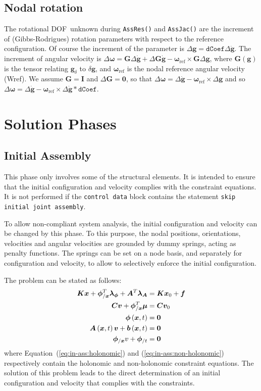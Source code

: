 \documentclass[10pt,dvips,fleqn,subeqn]{report}
\newcommand{\T}[1]{\bm{#1}}
\newcommand{\TT}[1]{\bm{#1}}
\newcommand{\dof}{DOF}
\begin{document}
\section{Nodal rotation}
The rotational \dof\ unknown during \texttt{AssRes()} and \texttt{AssJac()}
are the increment of (Gibbs-Rodrigues) rotation parameters
with respect to the reference configuration.
Of course the increment of the parameter is
$\Delta \T g=\texttt{dCoef}\Delta \dot{\T g}$.
The increment of angular velocity is 
$\Delta \T \omega = \T G\Delta \dot{\T g}+ \Delta \T G \dot{\T g}-
\T \omega_{\mathrm{ref}}\times \T G \Delta \T g$,
where $\T G(\T g)$ is the tensor relating $\T g_\delta$ to $\delta \T g$,
and $\T \omega_{\mathrm{ref}}$ is the nodal reference angular velocity (Wref).
We assume $\T G = \T I$ and $\Delta \T G = \T 0$,
so that $\Delta \T \omega = \Delta \dot{\T g}-\T \omega_{\mathrm{ref}}\times\Delta \T g$
and so $\Delta \T \omega = \Delta \dot{\T g}-
\T \omega_{\mathrm{ref}}\times\Delta \dot{\T g} * \texttt{dCoef}$.


\chapter{Solution Phases}
\section{Initial Assembly}
This phase only involves some of the structural elements.
It is intended to ensure that the initial configuration and velocity 
complies with the constraint equations.
It is not performed if the \texttt{control data} block contains 
the statement \texttt{skip initial joint assembly}.

To allow non-compliant system analysis, the initial configuration 
and velocity can be changed by this phase.
To this purpose, the nodal positions, orientations, velocities
and angular velocities are grounded by dummy springs, acting 
as penalty functions.
The springs can be set on a node basis, and separately 
for configuration and velocity, to allow to selectively enforce 
the initial configuration.

The problem can be stated as follows:
\begin{align}
	\TT{K} \T{x} + \T{\phi}_{/\T{x}}^T \T{\lambda}_{\T{\phi}} + \TT{A}^T \T{\lambda}_{\TT{A}}
		& = \TT{K} \T{x}_0 + \T{f} \\
	\TT{C} \T{v} + \T{\phi}_{/\T{x}}^T \T{\mu} & = \TT{C} \T{v}_0 \\
	\T{\phi}\plbr{\T{x}, t} & = \T{0} \label{eq:in-ass:holonomic} \\
	\TT{A}\plbr{\T{x}, t} \T{v} + \T{b}\plbr{\T{x}, t} & = \T{0} \label{eq:in-ass:non-holonomic} \\
	\T{\phi}_{/\T{x}} v + \T{\phi}_{/t} & = \T{0}
\end{align}
where Equation~(\ref{eq:in-ass:holonomic}) and (\ref{eq:in-ass:non-holonomic})
respectively contain the holonomic and non-holonomic constraint equations.
The solution of this problem leads to the direct determination
of an initial configuration and velocity that complies 
with the constraints.
\end{document}
